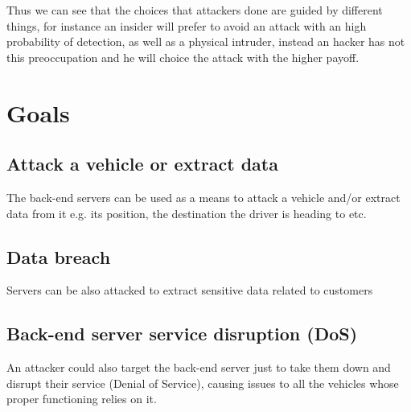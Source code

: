 \noindent  Thus we can see that the choices that attackers done are guided by different things, for instance an insider will prefer to avoid an attack with an high probability of detection, as well as a physical intruder, instead an hacker has not this preoccupation and he will choice the attack with the higher payoff.

\section{Goals}

\subsection*{Attack a vehicle or extract data}
The back-end servers can be used as a means to attack a vehicle and/or extract data from it e.g. its position, the destination the driver is heading to etc.

\subsection*{Data breach}
Servers can be also attacked to extract sensitive data related to customers

\subsection*{Back-end server service disruption (DoS)}
An attacker could also target the back-end server just to take them down and disrupt their service (Denial of Service), causing issues to all the vehicles whose proper functioning relies on it.